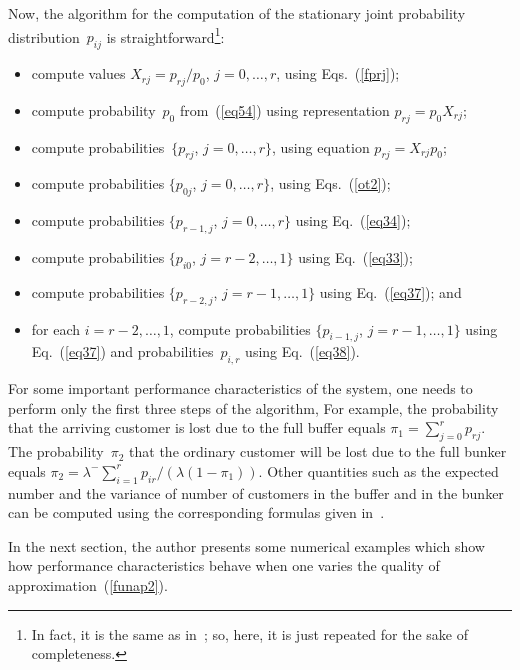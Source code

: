 \begin{multicols}{2}
Now, the algorithm for the computation of the stationary
joint probability distribution~$p_{ij}$ is 
straightforward\footnote{In fact, it is the same as in~\cite{aaa6}; 
so, here, it is just repeated for the sake of completeness.}:
\begin{itemize}
 \item
 compute values $X_{rj}=p_{rj}/p_0$, $j= 0 ,\dots , r$,
 using Eqs.~(\ref{fprj});

 \item
 compute probability~$p_0$ from~(\ref{eq54}) using representation $p_{rj}=p_0X_{rj}$;

 \item
compute  probabilities~$\{p_{rj}$, $j= 0 ,\dots , r \}$,
using equation $p_{rj}=X_{rj} p_0$;

  \item
 compute probabilities $\{p_{0j}$, $j=0 ,\dots , r \}$,
 using Eqs.~(\ref{ot2});
   \item
 compute probabilities $\{p_{r-1,j}$, $j=0 ,\dots , r \}$  using Eq.~(\ref{eq34});

     \item
     compute probabilities $\{p_{i0}$, $j=r-2 ,\dots , 1 \}$  using Eq.~(\ref{eq33});

      \item
     compute probabilities $\{p_{r-2,j}$, $j= r-1 ,\dots , 1 \}$  using Eq.~(\ref{eq37});
     and

    \item
    for each $i=r-2 ,\dots , 1$, compute probabilities $\{p_{i-1,j}$, $j= r-1 ,\dots , 1\}$
     using Eq.~(\ref{eq37}) and probabilities~$p_{i,r}$ using Eq.~(\ref{eq38}).
\end{itemize}

For some important performance characteristics of the system,
one needs to perform only the first three steps of the algorithm,
For example, the probability that the arriving customer
is lost due to the full buffer equals $\pi_{1}=\sum\nolimits_{j=0}^{r}p_{rj}$.
The probability~$\pi_{2}$ that the ordinary customer
will be lost due to the full bunker equals
$\pi_{2}=\lambda^- \sum_{i=1}^{r}p_{ir} /  (\lambda (1-\pi_{1})).$
Other quantities such as the expected number and the variance of  
number of customers in the buffer and in the bunker can be computed
using the corresponding formulas given in~\cite{aaa6}.

In the next section, the author presents some numerical examples
which show how performance characteristics behave when
one varies the quality of approximation~(\ref{funap2}).


\end{multicols}
